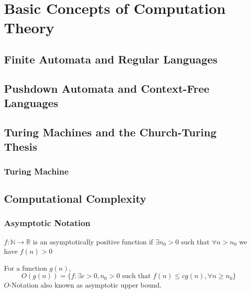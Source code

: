 		\chapter{Basic Concepts of Computation Theory}
			\section{Finite Automata and Regular Languages}

			\section{Pushdown Automata and Context-Free Languages}

			\section{Turing Machines and the Church-Turing Thesis}
				\subsection{Turing Machine}

				\subsection{}

			\section{Computational Complexity}
				\subsection{Asymptotic Notation}
					\begin{definition}
						$f: \mathbb{N} \rightarrow \mathbb{R}$ is an asymptotically positive function if $\exists n_0 > 0$ such that $\forall n > n_0$ we have $f(n) > 0$
					\end{definition}

					\begin{definition}[$O$-Notation]
						For a function $g(n)$, 
						\begin{equation*}
							O(g(n)) = \{f: \exists c > 0, n_0 > 0 \text{ such that } f(n) \le cg(n), \forall n\ge n_0\}
						\end{equation*}
						$O$-Notation also known as asymptotic upper bound. 
					\end{definition}				

